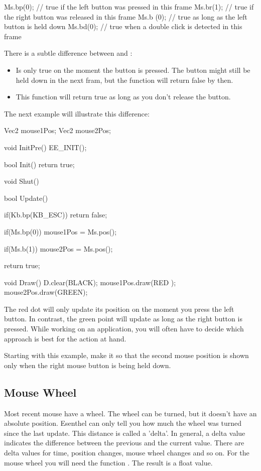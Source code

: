 \begin{code}
Ms.bp(0); // true if the left button was pressed in this frame
Ms.br(1); // true if the right button was released in this frame
Ms.b (0); // true as long as the left button is held down
Ms.bd(0); // true when a double click is detected in this frame
\end{code}

There is a subtle difference between  and :
\begin{itemize}
	\item {} Is only true on the moment the button is pressed. The button might still be held down in the next fram, but the function will return false by then.
	\item {} This function will return true as long as you don't release the button.
\end{itemize}

The next example will illustrate this difference:

\begin{code}
Vec2 mouse1Pos;
Vec2 mouse2Pos;

void InitPre()
{
   EE_INIT();
}

bool Init()
{   
   return true;
}

void Shut() {}

bool Update()
{
   if(Kb.bp(KB_ESC)) return false;
   
   if(Ms.bp(0)) {
      mouse1Pos = Ms.pos();
   }
   
   if(Ms.b(1)) {
      mouse2Pos = Ms.pos();
   }
   
   return true;
}

void Draw()
{
   D.clear(BLACK);
   mouse1Pos.draw(RED  );
   mouse2Pos.draw(GREEN);
}
\end{code}

The red dot will only update its position on the moment you press the left button. In contrast, the green point will update as long as the right button is pressed. While working on an application, you will often have to decide which approach is best for the action at hand.

\begin{exercise}
Starting with this example, make it so that the second mouse position is shown only when the right mouse button is being held down.
\end{exercise} 


\subsection{Mouse Wheel}
Most recent mouse have a wheel. The wheel can be turned, but it doesn't have an absolute position. Esenthel can only tell you how much the wheel was turned since the last update. This distance is called a 'delta'. In general, a delta value indicates the difference between the previous and the current value. There are delta values for time, position changes, mouse wheel changes and so on. For the mouse wheel you will need the function . The result is a float value.

